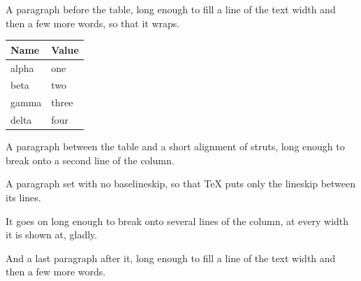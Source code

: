 \documentclass{article}
\begin{document}
A paragraph before the table, long enough to fill a line of the text width
and then a few more words, so that it wraps.
\begin{longtable}{|l|l|}\hline
Name & Value \\ \hline\hline
alpha & one \\
beta & two \\
gamma & three \\ \hline
delta & four \\ \hline
\end{longtable}
A paragraph between the table and a short alignment of struts, long enough
to break onto a second line of the column.

{\offinterlineskip
{}}
A paragraph set with no baselineskip, so that TeX puts only the lineskip
between its lines. {\baselineskip=0pt It goes on long enough to break onto
several lines of the column, at every width it is shown at, gladly.\par}
And a last paragraph after it, long enough to fill a line of the text width
and then a few more words.
\end{document}
